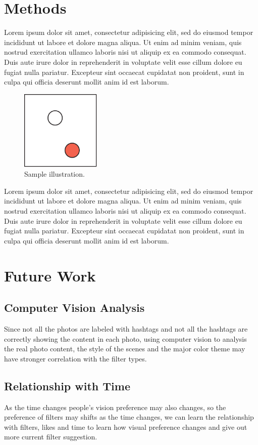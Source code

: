 \documentclass[conference]{acmsiggraph}
\begin{document}
\section{Methods}

Lorem ipsum dolor sit amet, consectetur adipisicing elit, sed do
eiusmod tempor incididunt ut labore et dolore magna aliqua. Ut enim ad
minim veniam, quis nostrud exercitation ullamco laboris nisi ut
aliquip ex ea commodo consequat. Duis aute irure dolor in
reprehenderit in voluptate velit esse cillum dolore eu fugiat nulla
pariatur. Excepteur sint occaecat cupidatat non proident, sunt in
culpa qui officia deserunt mollit anim id est laborum.

\begin{figure}[ht]
  \centering
  \includegraphics[width=1.5in]{images/samplefigure}
  \caption{Sample illustration.}
\end{figure}
Lorem ipsum dolor sit amet, consectetur adipisicing elit, sed do
eiusmod tempor incididunt ut labore et dolore magna aliqua. Ut enim ad
minim veniam, quis nostrud exercitation ullamco laboris nisi ut
aliquip ex ea commodo consequat. Duis aute irure dolor in
reprehenderit in voluptate velit esse cillum dolore eu fugiat nulla
pariatur. Excepteur sint occaecat cupidatat non proident, sunt in
culpa qui officia deserunt mollit anim id est laborum.

\section{Future Work}

\subsection{Computer Vision Analysis}
Since not all the photos are labeled with hashtags and not all the hashtags are correctly showing the content in each photo, using computer vision to analysis the real photo content, the style of the scenes and the major color theme may have stronger correlation with the filter types.
\subsection{Relationship with Time}
As the time changes people’s vision preference may also changes, so the preference of filters may shifts as the time changes, we can learn the relationship with filters, likes and time to learn how visual preference changes and give out more current filter suggestion.
\end{document}
